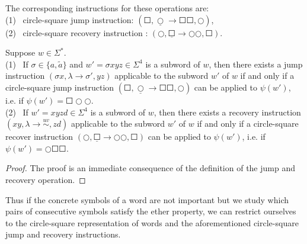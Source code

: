 The corresponding instructions for these operations are:\\
\indent \indent (1) \ circle-square jump instruction: $(\Square, \underline{\Circle} \to \Square \Square, \Circle)$,\\
\indent \indent (2) \ circle-square recovery instruction : $(\Circle, \underline{\Square} \to \Circle \Circle, \Square)$.

\begin{lemma}\label{lemma:circle-square-jump-and-recover}
Suppose $w \in \Sigma^*$.\\
\indent (1) \ If $\sigma \in \{a, \tilde{a}\}$ and $w' = \sigma x y z \in \Sigma^4$ is a subword of $w$, then there exists a jump instruction $(\sigma x, \lambda \to \sigma', yz)$ applicable to the subword $w'$ of $w$ if and only if a circle-square jump instruction $(\Square, \underline{\Circle} \to \Square \Square, \Circle)$ can be applied to $\psi(w')$, i.e. if $\psi(w') = \Square \Circle \Circle$.\\
\indent (2) \ If $w' = x y z d \in \Sigma^4$ is a subword of $w$, then there exists a recovery instruction $(xy, \lambda \to \stackrel{uv}{\sim}, zd)$ applicable to the subword $w'$ of $w$ if and only if a circle-square recover instruction $(\Circle, \underline{\Square} \to \Circle \Circle, \Square)$ can be applied to $\psi(w')$, i.e. if $\psi(w') = \Circle \Square \Square$.
\end{lemma}

\begin{proof}
The proof is an immediate consequence of the definition of the jump and recovery operation.
\end{proof}


Thus if the concrete symbols of a word are not important but we study which pairs of consecutive symbols satisfy the ether property, we can restrict ourselves to the circle-square representation of words and
the aforementioned circle-square jump and recovery instructions.

